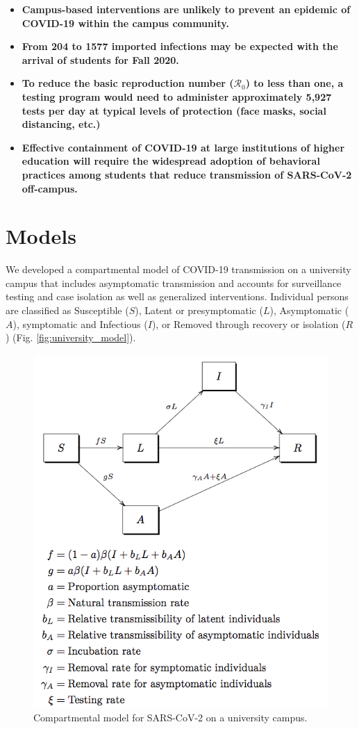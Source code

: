 \documentclass[
]{article}
\providecommand{\tightlist}{%
  \setlength{\itemsep}{0pt}\setlength{\parskip}{0pt}}
\begin{document}
\begin{itemize}
\tightlist
\item
  \textbf{Campus-based interventions are unlikely to prevent an epidemic
  of COVID-19 within the campus community.}
\item
  \textbf{From 204 to 1577 imported infections may be expected with the
  arrival of students for Fall 2020.}
\item
  \textbf{To reduce the basic reproduction number (\(\mathcal{R}_{0}\))
  to less than one, a testing program would need to administer
  approximately 5,927 tests per day at typical levels of protection
  (face masks, social distancing, etc.)}
\item
  \textbf{Effective containment of COVID-19 at large institutions of
  higher education will require the widespread adoption of behavioral
  practices among students that reduce transmission of SARS-CoV-2
  off-campus.}
\end{itemize}

\hypertarget{models}{%
\section{Models}\label{models}}

We developed a compartmental model of COVID-19 transmission on a
university campus that includes asymptomatic transmission and accounts
for surveillance testing and case isolation as well as generalized
interventions. Individual persons are classified as Susceptible (\(S\)),
Latent or presymptomatic (\(L\)), Asymptomatic (\(A\)), symptomatic and
Infectious (\(I\)), or Removed through recovery or isolation (\(R\))
(Fig. \ref{fig:university_model}).

\begin{figure}

{\centering \includegraphics[width=0.7\linewidth]{university_SLAIR} 

}

\caption{\label{fig:university_model}Compartmental model for SARS-CoV-2 on a university campus.}\label{fig:unnamed-chunk-1}
\end{figure}
\end{document}
